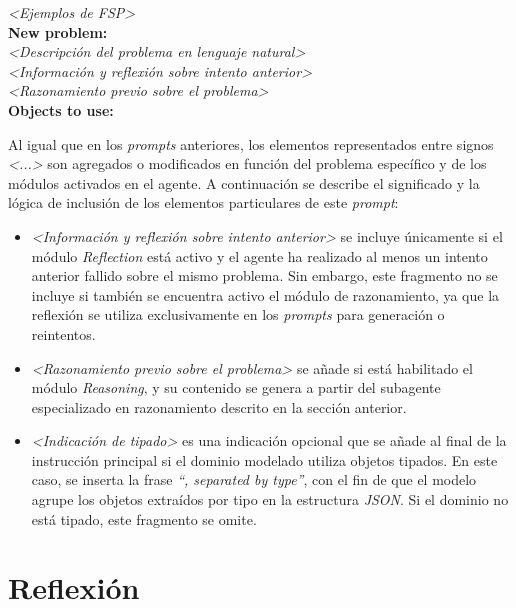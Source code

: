 \begin{anexes}
\begin{tcolorbox}[colback=gray!10!white, colframe=black, title=\textit{Prompt} del agente de extracción de objetos, fonttitle=\bfseries, breakable]
\textit{<Ejemplos de FSP>}\\

\textbf{New problem:} \\
\textit{<Descripción del problema en lenguaje natural>}\\

\textit{<Información y reflexión sobre intento anterior>}\\

\textit{<Razonamiento previo sobre el problema>}\\

\textbf{Objects to use:}
\end{tcolorbox}

Al igual que en los \textit{prompts} anteriores, los elementos representados entre signos \textit{<...>} son agregados o modificados en función del problema específico y de los módulos activados en el agente. A continuación se describe el significado y la lógica de inclusión de los elementos particulares de este \textit{prompt}:

\begin{itemize}
    \item \textit{<Información y reflexión sobre intento anterior>} se incluye únicamente si el módulo \textit{Reflection} está activo y el agente ha realizado al menos un intento anterior fallido sobre el mismo problema. Sin embargo, este fragmento no se incluye si también se encuentra activo el módulo de razonamiento, ya que la reflexión se utiliza exclusivamente en los \textit{prompts} para generación o reintentos.

    \item \textit{<Razonamiento previo sobre el problema>} se añade si está habilitado el módulo \textit{Reasoning}, y su contenido se genera a partir del subagente especializado en razonamiento descrito en la sección anterior.

    \item \textit{<Indicación de tipado>} es una indicación opcional que se añade al final de la instrucción principal si el dominio modelado utiliza objetos tipados. En este caso, se inserta la frase \textit{``, separated by type''}, con el fin de que el modelo agrupe los objetos extraídos por tipo en la estructura \textit{JSON}. Si el dominio no está tipado, este fragmento se omite.
\end{itemize}

\section*{Reflexión}


\end{anexes}
